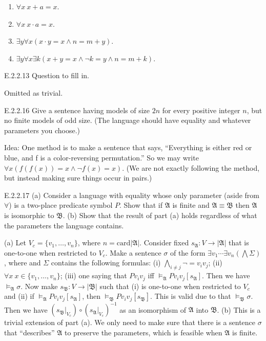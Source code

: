 \begin{enumerate}
  \item $\forall x\ x+a=x$.
  \item $\forall x\ x\cdot a=x$.
  \item $\exists y\forall x(x\cdot y=x\wedge n=m+y)$.
  \item $\exists y\forall x\exists k(x+y=x\wedge \neg k=y\wedge n=m+k)$.
\end{enumerate}


\setcounter{exercise}{12}

\begin{exercise}{E.2.2.13}
  Question to fill in.
\end{exercise}

Omitted as trivial.

\setcounter{exercise}{15}

\begin{exercise}{E.2.2.16}
  Give a sentence having models of size $2n$ for every positive integer $n$, but no finite models of odd size. (The language should have equality and whatever parameters you choose.)
\end{exercise}

Idea: One method is to make a sentence that says, “Everything is either red or blue, and f is a color-reversing permutation.” So we may write $\forall x(f(f(x))=x\wedge\neg f(x)=x)$. (We are not exactly following the method, but instead making sure things occur in pairs.)

\begin{exercise}{E.2.2.17}
  (a) Consider a language with equality whose only parameter (aside from $\forall$) is a two-place predicate symbol $P$. Show that if $\mathfrak{A}$ is finite and $\mathfrak{A}\equiv \mathfrak{B}$ then $\mathfrak{A}$ is isomorphic to $\mathfrak{B}$.
  (b) Show that the result of part (a) holds regardless of what the parameters the language contains.
\end{exercise}

(a) Let $V_c=\{v_1,\dots,v_n\}$, where $n=\mathrm{card}|\mathfrak{A}|$. Consider fixed $s_{\mathfrak{A}}:V\to|\mathfrak{A}|$ that is one-to-one when restricted to $V_c$.  Make a sentence $\sigma$ of the form $\exists v_1\cdots\exists v_n(\bigwedge \Sigma)$, where  and $\Sigma$ contains the following formulas: (i) $\bigwedge_{i\neq j}\neg =v_iv_j$; (ii) $\forall x\ x\in\{v_1,\dots,v_n\}$; (iii) one saying that $Pv_iv_j$ iff $\vDash_{\mathfrak{A}}Pv_iv_j[s_{\mathfrak{A}}]$. Then we have $\vDash_{\mathfrak{A}}\sigma$. Now make $s_{\mathfrak{B}}:V\to|\mathfrak{B}|$ such that (i) is one-to-one when restricted to $V_c$ and (ii) if $\vDash_{\mathfrak{A}}Pv_iv_j[s_{\mathfrak{A}}]$, then $\vDash_{\mathfrak{B}}Pv_iv_j[s_{\mathfrak{B}}]$. This is valid due to that $\vDash_{\mathfrak{B}}\sigma$. Then we have $(s_{\mathfrak{B}}|_{V_c})\circ(s_{\mathfrak{A}}|_{V_c})^{-1}$ as an isomorphism of $\mathfrak{A}$ into $\mathfrak{B}$.
(b) This is a trivial extension of part (a). We only need to make sure that there is a sentence $\sigma$ that ``describes'' $\mathfrak{A}$ to preserve the parameters, which is feasible when $\mathfrak{A}$ is finite.

